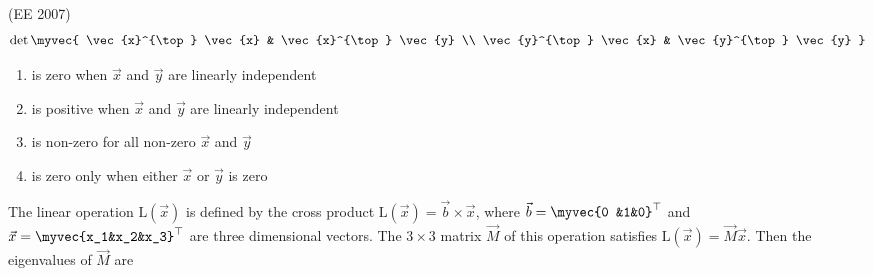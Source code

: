 \hfill{(EE 2007)} 
$$
\det\myvec{
\vec{x}^{\top} \vec{x} & \vec{x}^{\top} \vec{y} \\
\vec{y}^{\top} \vec{x} & \vec{y}^{\top} \vec{y} 
}
$$
\begin{enumerate}
\item is zero when $\vec{x}$ and $\vec{y}$ are linearly independent
\item is positive when $\vec{x}$ and $\vec{y}$ are linearly independent
\item is non-zero for all non-zero $\vec{x}$ and $\vec{y}$
\item is zero only when either $\vec{x}$ or $\vec{y}$ is zero
\end{enumerate}
%
\item  The linear operation $\mathrm{L}(\vec{x})$ is defined by the cross product $\mathrm{L}(\vec{x}) = \vec{b} \times \vec{x}$, where $\vec{b} = \myvec{0 &1&0}^{\top}$ and $\vec{x} = \myvec{x_1&x_2&x_3}^{\top}$ are three dimensional vectors. The $3 \times 3$ matrix $\vec{M}$ of this operation satisfies
$
    \mathrm{L}(\vec{x}) = \vec{M}\vec{x}.     
$
Then the eigenvalues of $\vec{M}$ are 

